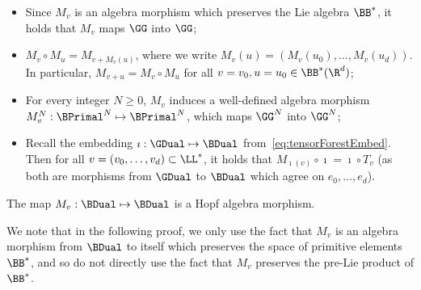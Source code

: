 \documentclass{article}
\begin{document}
\begin{itemize}
\item Since $M_v$ is an algebra morphism which preserves the Lie algebra $\BB^*$, it holds that $M_v$ maps $\GG$ into $\GG$;

\item $M_v \circ M_u = M_{v + M_v(u)}$, where we write $M_v(u) = (M_v(u_0),\ldots, M_v(u_d))$. In particular, $M_{v+u} = M_{v} \circ M_u$ for all $v = v_0,u = u_0 \in \BB^*(\R^d)$;

\item For every integer $N \geq 0$, $M_v$ induces a well-defined algebra morphism $M_v^N : \BPrimal^N \mapsto \BPrimal^N$, which maps $\GG^N$ into $\GG^N$;

\item Recall the embedding $\imath : \GDual \mapsto \BDual$ from~\eqref{eq:tensorForestEmbed}. Then for all $v = (v_0,\ldots, v_d) \subset \LL^*$, it holds that $M_{\imath(v)} \circ \imath = \imath \circ T_v$ (as both are morphisms from $\GDual$ to $\BDual$ which agree on $e_0,\ldots, e_d$).
\end{itemize}


\begin{lemma}\label{lem:HopfMorphBranched}
The map $M_v : \BDual \mapsto \BDual$ is a Hopf algebra morphism.
\end{lemma}


\begin{remark}
We note that in the following proof, we only use the fact that $M_v$ is an algebra morphism from $\BDual$ to itself which preserves the space of primitive elements $\BB^*$, and so do not directly use the fact that $M_v$ preserves the pre-Lie product of $\BB^*$.
\end{remark}
\end{document}
